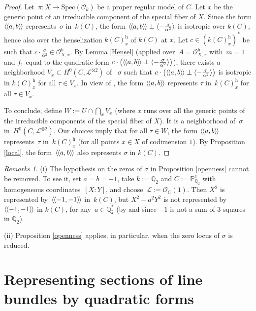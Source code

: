 \documentclass{amsart}
\theoremstyle{definition}
\theoremstyle{remark}
\newtheorem{rems}[thm]{Remarks}
\numberwithin{equation}{section}
\newcommand{\Spec}{\mathrm{Spec}}
\newcommand{\h}{\mathrm{h}}
\newcommand{\llangle}{\langle\kern-.1em\langle}
\newcommand{\rrangle}{\rangle\kern-.1em\rangle}
\def\Q{\mathbb Q}
\def\P{\mathbb P}
\def\cL{\mathcal{L}}
\def\cO{\mathcal{O}}
\begin{document}
\begin{proof}
Let~$\pi:X\to \Spec(\cO_k)$ be a proper regular model of $C$. Let $x$ be the generic point of an irreducible component of the special fiber of $X$. Since the form $\llangle a,b\rrangle$ represents~$\sigma$ in~$k(C)$,
the form $\llangle a,b\rrangle\perp\langle-\frac{\sigma}{\alpha^2}\rangle$ is isotropic over $k(C)$, hence also over the henselization $k(C)^{\h}_x$ of $k(C)$ at $x$. Let $c\in (k(C)^{\h}_x)^*$ be such that $c\cdot\frac{\sigma}{\alpha^2}\in\cO_{X,x}^{\h}$. By Lemma \ref{Hensel} (applied over~$A=\cO_{X,x}^{\h}$ with~$m=1$ and $f_1$ equal to the quadratic form $c\cdot\big(\llangle a,b\rrangle\perp\langle-\frac{\sigma}{\alpha^2}\rangle\big)$), there exists a neighborhood $V_x\subset H^0(C,\cL^{\otimes 2})$ of ~$\sigma$ such that 
$c\cdot\big(\llangle a,b\rrangle\perp\langle-\frac{\tau}{\alpha^2}\rangle\big)$ is isotropic in $k(C)^{\h}_x$ for all $\tau\in V_x$. In view of \cite[I.3.4]{Lam}, the form $\llangle a,b\rrangle$ represents $\tau$ in~$k(C)_x^{\h}$ for all $\tau\in V_x$.

To conclude, define $W:=U\cap \bigcap_xV_x$ (where $x$ runs over all the generic points of the irreducible components of the special fiber of $X$). It is a neighborhood of~$\sigma$ in~$H^0(C,\cL^{\otimes 2})$. Our choices imply that for all $\tau\in W$, the form $\llangle a,b\rrangle$ represents~$\tau$ in~$k(C)_x^{\h}$ (for all points $x\in X$ of codimension $1$).  By Proposition \ref{local}, the form~$\llangle a,b\rrangle$ also represents $\sigma$ in $k(C)$.
\end{proof}

\begin{rems}
(i) The hypothesis on the zeros of $\sigma$ in Proposition \ref{openness} cannot be removed. To see it, set $a=b=-1$, take $k:=\Q_2$ and $C:=\P^1_{\Q_2}$ with homogeneous coordi\-nates~$[X:Y]$, and choose~$\cL:=\cO_{C}(1)$. Then $X^2$ is represented by~$\llangle-1,-1\rrangle$ in~$k(C)$, but $X^2-a^2Y^2$ is not represented by $\llangle-1,-1\rrangle$ in $k(C)$, for any~$a\in\Q_2^*$ (by \cite[IX.2.3]{Lam} and since $-1$ is not a sum of $3$ squares in $\Q_{2}$).

(ii) Proposition \ref{openness} applies, in particular, when the zero locus of $\sigma$ is reduced.
\end{rems}


\section{Representing sections of line bundles by quadratic forms}
\label{secquadric}
 
\end{document}
